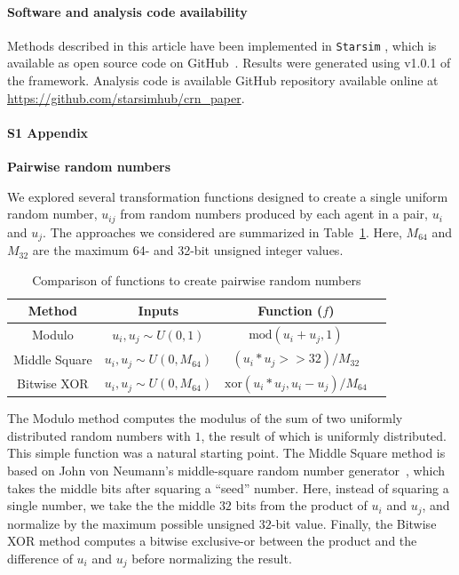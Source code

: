 \documentclass[10pt,letterpaper]{article}
\newcommand{\starsim}{\texttt{Starsim} }
\begin{document}
\paragraph*{Software and analysis code availability}
Methods described in this article have been implemented in \starsim, which is available as open source code on GitHub~\cite{starsim}. Results were generated using v1.0.1 of the framework. Analysis code is available GitHub repository available online at \url{https://github.com/starsimhub/crn_paper}.

\paragraph*{S1 Appendix}\label{a:pairwise}
{\bf Pairwise random numbers}

We explored several transformation functions designed to create a single uniform random number, $u_{ij}$ from random numbers produced by each agent in a pair, $u_i$ and $u_j$. The approaches we considered are summarized in Table~\ref{t:combine_rands}. Here, $M_{64}$ and $M_{32}$ are the maximum 64- and 32-bit unsigned integer values.
\begin{table}[hb!]
\caption{Comparison of functions to create pairwise random numbers}
\centering
\begin{tabular}{|c|c|c|c|}
    \hline
    \textbf{Method} & \textbf{Inputs} & \textbf{Function} ($f$) \\
    \hline
    Modulo & $u_i, u_j \sim U(0,1)$ & $\text{mod}(u_i + u_j, 1)$\\
    \hline
    Middle Square & $u_i, u_j \sim U(0,M_{64})$ & $\left( u_i * u_j >> 32 \right) / M_{32}$\\
    \hline
    Bitwise XOR & $u_i, u_j \sim U(0,M_{64})$ & $\text{xor}(u_i * u_j, u_i-u_j) / M_{64}$\\
     \hline
\end{tabular}
\label{t:combine_rands}
\end{table}

The Modulo method computes the modulus of the sum of two uniformly distributed random numbers with $1$, the result of which is uniformly distributed. This simple function was a natural starting point. The Middle Square method is based on John von Neumann’s middle-square random number generator~\cite{neumann1951various}, which takes the middle bits after squaring a ``seed'' number. Here, instead of squaring a single number, we take the the middle $32$ bits from the product of $u_i$ and $u_j$, and normalize by the maximum possible unsigned $32$-bit value. Finally, the Bitwise XOR method computes a bitwise exclusive-or between the product and the difference of $u_i$ and $u_j$ before normalizing the result.
\end{document}
